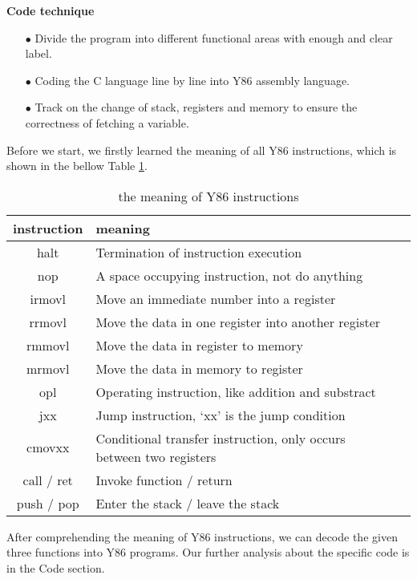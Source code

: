 \documentclass{article}
\begin{document}
{\normalsize\bfseries Code technique}
\begin{itemize}
\item[$\bullet$]Divide the program into different functional areas with enough and clear label.
\item[$\bullet$]Coding the C language line by line into Y86 assembly language. 
\item[$\bullet$]Track on the change of stack, registers and memory to ensure the correctness of fetching a variable.
\end{itemize}
\noindent
Before we start, we firstly learned the meaning of all Y86 instructions, which is shown in the bellow Table \ref{the meaning of Y86 instructions}.\\

\begin{table}[htbp]
\centering
\caption{the meaning of Y86 instructions}\label{the meaning of Y86 instructions}%
\begin{tabular}{|c | l | p{1.5cm}|}
		\hline%
		instruction & meaning\\%
		\hline 
		halt&Termination of instruction execution  \\
		\hline 
		nop& A space occupying instruction, not do anything \\
		\hline 
		irmovl&Move an immediate number into a register  \\
		\hline 
		rrmovl& Move the data in one register into another register \\
		\hline 
		rmmovl&Move the data in register to memory  \\
		\hline 
		mrmovl&Move the data in memory to register  \\
		\hline 
		opl&Operating instruction, like addition and substract  \\
		\hline 
		jxx&Jump instruction, ‘xx’ is the jump condition  \\
		\hline 
		cmovxx&Conditional transfer instruction, only occurs between two registers  \\
		\hline 
		call / ret &Invoke function / return\\
		\hline
		push / pop&Enter the stack / leave the stack\\
		\hline
\end{tabular}
\end{table}
\noindent
After comprehending the meaning of Y86 instructions, we can decode the given three functions into Y86 programs. Our further analysis about the specific code is in the Code section.\\
\end{document}
